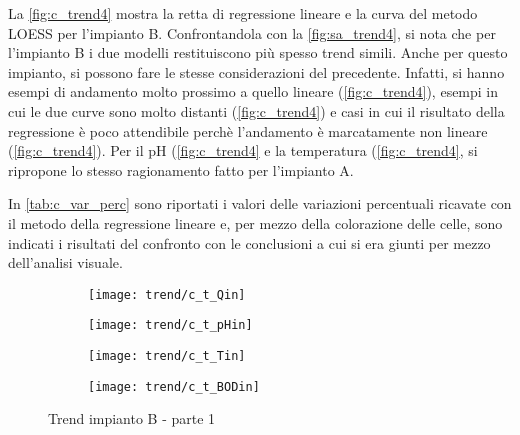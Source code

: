 \clearpage
La \autoref{fig:c_trend4} mostra la retta di regressione lineare e la curva del metodo LOESS per l'impianto B. Confrontandola con la \autoref{fig:sa_trend4}, si nota che per l'impianto B i due modelli restituiscono più spesso trend simili. Anche per questo impianto, si possono fare le stesse considerazioni del precedente. Infatti, si hanno esempi di andamento molto prossimo a quello lineare (\autoref{fig:c_trend4}), esempi in cui le due curve sono molto distanti (\autoref{fig:c_trend4}) e casi in cui il risultato della regressione è poco attendibile perchè l'andamento è marcatamente non lineare (\autoref{fig:c_trend4}). Per il pH (\autoref{fig:c_trend4} e la temperatura (\autoref{fig:c_trend4}, si ripropone lo stesso ragionamento fatto per l'impianto A.

In \autoref{tab:c_var_perc} sono riportati i valori delle variazioni percentuali ricavate con il metodo della regressione lineare e, per mezzo della colorazione delle celle, sono indicati i risultati del confronto con le conclusioni a cui si era giunti per mezzo dell'analisi visuale.


\begin{sidewaysfigure}[h]
	\renewcommand*\thesubfigure{(\arabic{subfigure})}
	\begin{subfigure}{0.49\textwidth}
		\texttt{[image: trend/c\_t\_Qin]}
		\caption{}
		\centering
	\end{subfigure}
	\begin{subfigure}{0.49\textwidth}
		\texttt{[image: trend/c\_t\_pHin]}
		\caption{}
		\label{fig:c_t_pHin}
		\centering
	\end{subfigure}

	\begin{subfigure}{0.49\textwidth}
		\texttt{[image: trend/c\_t\_Tin]}
		\caption{}
		\label{fig:c_t_Tin}
		\centering
	\end{subfigure}
	\begin{subfigure}{0.49\textwidth}
		\texttt{[image: trend/c\_t\_BODin]}	
		\caption{}
		\label{fig:c_t_BODin}
		\centering
	\end{subfigure}
	\caption{Trend impianto B - parte 1}
\end{sidewaysfigure}

